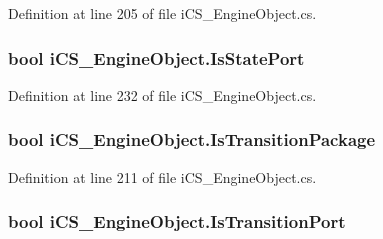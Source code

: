 Definition at line 205 of file i\+C\+S\+\_\+\+Engine\+Object.\+cs.

\hypertarget{classi_c_s___engine_object_a9d8a084f26170592a5871772f8a4ecce}{
\subsubsection[{Is\+State\+Port}]{\setlength{\rightskip}{0pt plus 5cm}bool i\+C\+S\+\_\+\+Engine\+Object.\+Is\+State\+Port\hspace{0.3cm}{\ttfamily [get]}}}\label{classi_c_s___engine_object_a9d8a084f26170592a5871772f8a4ecce}


Definition at line 232 of file i\+C\+S\+\_\+\+Engine\+Object.\+cs.

\hypertarget{classi_c_s___engine_object_a10cbd0acc0b4f2c153a0d3c328d2d877}{
\subsubsection[{Is\+Transition\+Package}]{\setlength{\rightskip}{0pt plus 5cm}bool i\+C\+S\+\_\+\+Engine\+Object.\+Is\+Transition\+Package\hspace{0.3cm}{\ttfamily [get]}}}\label{classi_c_s___engine_object_a10cbd0acc0b4f2c153a0d3c328d2d877}


Definition at line 211 of file i\+C\+S\+\_\+\+Engine\+Object.\+cs.

\hypertarget{classi_c_s___engine_object_afe43286c50e7ec7e930254534e0cb35f}{
\subsubsection[{Is\+Transition\+Port}]{\setlength{\rightskip}{0pt plus 5cm}bool i\+C\+S\+\_\+\+Engine\+Object.\+Is\+Transition\+Port\hspace{0.3cm}{\ttfamily [get]}}}\label{classi_c_s___engine_object_afe43286c50e7ec7e930254534e0cb35f}


